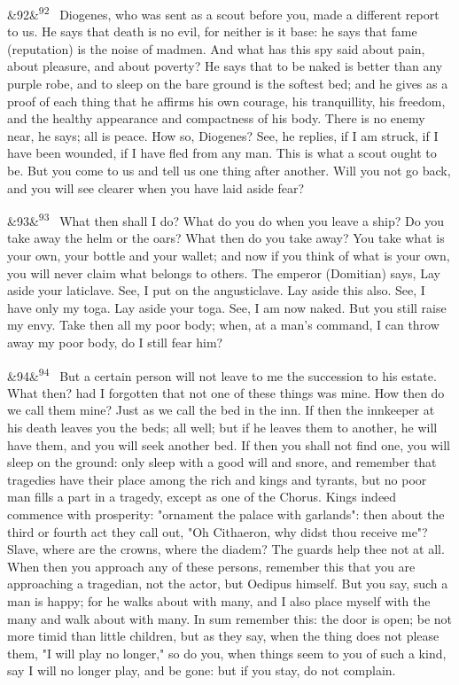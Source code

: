 \documentclass[12pt]{article}
\newcommand{\para}[1][]{\par\noindent\ifx&#1&\else\textsuperscript{\footnotesize #1}~\fi}
\begin{document}
\para[92] Diogenes, who was sent as a scout before you, made a different report to us. He says that death is no evil, for neither is it base: he says that fame (reputation) is the noise of madmen. And what has this spy said about pain, about pleasure, and about poverty? He says that to be naked is better than any purple robe, and to sleep on the bare ground is the softest bed; and he gives as a proof of each thing that he affirms his own courage, his tranquillity, his freedom, and the healthy appearance and compactness of his body. There is no enemy near, he says; all is peace. How so, Diogenes? See, he replies, if I am struck, if I have been wounded, if I have fled from any man. This is what a scout ought to be. But you come to us and tell us one thing after another. Will you not go back, and you will see clearer when you have laid aside fear?

\para[93] What then shall I do? What do you do when you leave a ship? Do you take away the helm or the oars? What then do you take away? You take what is your own, your bottle and your wallet; and now if you think of what is your own, you will never claim what belongs to others. The emperor (Domitian) says, Lay aside your laticlave. See, I put on the angusticlave. Lay aside this also. See, I have only my toga. Lay aside your toga. See, I am now naked. But you still raise my envy. Take then all my poor body; when, at a man's command, I can throw away my poor body, do I still fear him?

\para[94] But a certain person will not leave to me the succession to his estate. What then? had I forgotten that not one of these things was mine. How then do we call them mine? Just as we call the bed in the inn. If then the innkeeper at his death leaves you the beds; all well; but if he leaves them to another, he will have them, and you will seek another bed. If then you shall not find one, you will sleep on the ground: only sleep with a good will and snore, and remember that tragedies have their place among the rich and kings and tyrants, but no poor man fills a part in a tragedy, except as one of the Chorus. Kings indeed commence with prosperity: "ornament the palace with garlands": then about the third or fourth act they call out, "Oh Cithaeron, why didst thou receive me"? Slave, where are the crowns, where the diadem? The guards help thee not at all. When then you approach any of these persons, remember this that you are approaching a tragedian, not the actor, but Oedipus himself. But you say, such a man is happy; for he walks about with many, and I also place myself with the many and walk about with many. In sum remember this: the door is open; be not more timid than little children, but as they say, when the thing does not please them, "I will play no longer," so do you, when things seem to you of such a kind, say I will no longer play, and be gone: but if you stay, do not complain.
\end{document}
